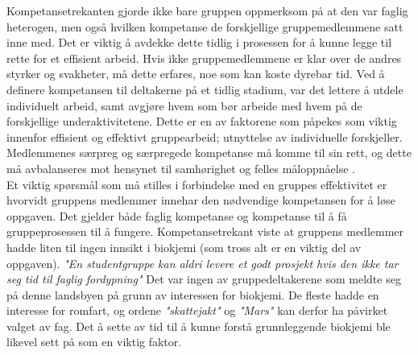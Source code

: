 Kompetansetrekanten gjorde ikke bare gruppen oppmerksom på at den var faglig heterogen, men også hvilken kompetanse de forskjellige gruppemedlemmene satt inne med.
Det er viktig å avdekke dette tidlig i prosessen for å kunne legge til rette for et effisient arbeid.
Hvis ikke gruppemedlemmene er klar over de andres styrker og svakheter, må dette erfares, noe som kan koste dyrebar tid.
Ved å definere kompetansen til deltakerne på et tidlig stadium, var det lettere å utdele individuelt arbeid, samt avgjøre hvem som bør arbeide med hvem på de forskjellige underaktivitetene.
Dette er en av faktorene som påpekes som viktig innenfor effisient og effektivt gruppearbeid; utnyttelse av individuelle forskjeller.
Medlemmenes særpreg og særpregede kompetanse må komme til sin rett, og dette må avbalanseres mot hensynet til samhørighet og felles måloppnåelse \cite{orgorg}. 
\\
Et viktig spørsmål som må stilles i forbindelse med en gruppes effektivitet er hvorvidt gruppens medlemmer innehar den nødvendige kompetansen for å løse oppgaven.
Det gjelder både faglig kompetanse og kompetanse til å få gruppeprosessen til å fungere.
Kompetansetrekant viste at gruppens medlemmer hadde liten til ingen innsikt i biokjemi (som tross alt er en viktig del av oppgaven).
\textit{"En studentgruppe kan aldri levere et godt prosjekt hvis den ikke tar seg tid til faglig fordypning"} \cite{orgorg}
Det var ingen av gruppedeltakerene som meldte seg på denne landsbyen på grunn av interessen for biokjemi.
De fleste hadde en interesse for romfart, og ordene \emph{"skattejakt"} og \emph{"Mars"} kan derfor ha påvirket valget av fag.
Det å sette av tid til å kunne forstå grunnleggende biokjemi ble likevel sett på som en viktig faktor.
\\
